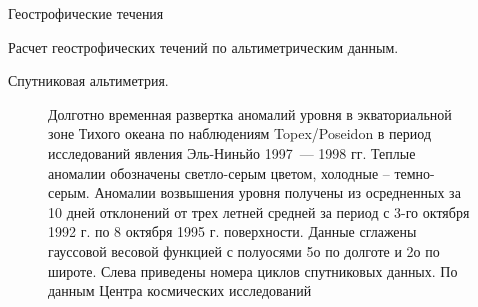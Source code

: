 \begin{chapter}{Геострофические течения}
\begin{section}{Расчет геострофических течений по альтиметрическим данным.}
\begin{paragraph}{Спутниковая альтиметрия.}
\begin{figure}[t!]
\caption{Долготно временная развертка аномалий уровня в экваториальной
зоне Тихого океана по наблюдениям Topex/Poseidon в период исследований
явления Эль-Ниньйо 1997~--- 1998 гг. Теплые аномалии обозначены
светло-серым цветом, холодные – темно-серым. Аномалии возвышения
уровня получены из осредненных за 10 дней отклонений от трех летней
средней за период с 3-го октября 1992 г. по 8 октября 1995
г. поверхности. Данные сглажены гауссовой весовой функцией с полуосями
5о по долготе и 2о по широте. Слева приведены номера циклов
спутниковых данных. По данным Центра космических исследований
}
\end{figure}
\end{paragraph}
\end{section}
\end{chapter}
